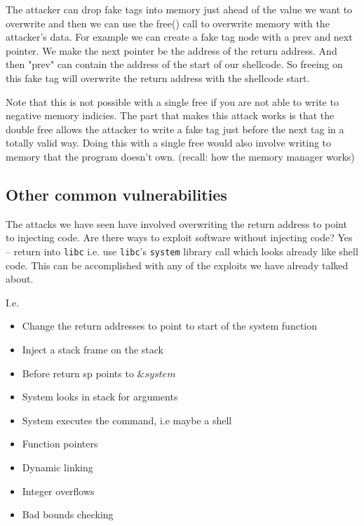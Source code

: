 \documentclass[../notes.tex]{subfiles}
\begin{document}
The attacker can drop fake tags into memory just ahead of the value we want to overwrite and then we can use the free() call to overwrite memory with the attacker's data.
For example we can create a fake tag node with a prev and next pointer. We make the next pointer be the address of the return address. And then "prev" can contain the address of the start of our shellcode. So freeing on this fake tag will overwrite the return address with the shellcode start.



\begin{blockquote}
    Note that this is not possible with a single free if you are not able to write to negative memory indicies. 
    The part that makes this attack works is that the double free allows the attacker to write a fake tag just before the next tag in a totally valid way. Doing this with a single free would also involve writing to memory that the program doesn't own. (recall: how the memory manager works)
    

\end{blockquote}





\subsection{Other common vulnerabilities}

The attacks we have seen have involved overwriting the return address to point to injecting code. Are there ways to exploit software without injecting code? Yes -- return into \texttt{libc} i.e. use \texttt{libc}'s \texttt{system} library call which looks already like shell code.
This can be accomplished with any of the exploits we have already talked about.

I.e.

\begin{itemize}
    \item Change the return addresses to point to start of the system function
    \item Inject a stack frame on the stack
    \item Before return sp points to $ \&system $
    \item System looks in stack for arguments
    \item System executes the command, i.e maybe a shell
\end{itemize}


\begin{itemize}
    \item Function pointers
    \item Dynamic linking
    \item Integer overflows
    \item Bad bounds checking
\end{itemize}
\end{document}
